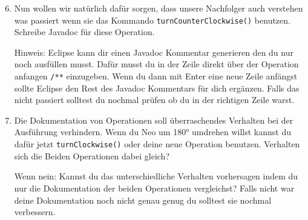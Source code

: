 \begin{enumerate}\setcounter{enumi}{5}
    \item Nun wollen wir natürlich dafür sorgen, dass unsere Nachfolger auch verstehen was passiert wenn sie das Kommando \lstinline{turnCounterClockwise()} benutzen. 
        Schreibe Javadoc für diese Operation.
        
        Hinweis: Eclipse kann dir einen Javadoc Kommentar generieren den du nur noch ausfüllen musst.
        Dafür musst du in der Zeile direkt über der Operation anfangen \lstinline{/**} einzugeben.
        Wenn du dann mit Enter eine neue Zeile anfängst sollte Eclipse den Rest des Javadoc Kommentars für dich ergänzen.
        Falls das nicht passiert solltest du nochmal prüfen ob du in der richtigen Zeile warst.
    \item Die Dokumentation von Operationen soll überraschendes Verhalten bei der Ausführung verhindern. 
        Wenn du Neo um 180° umdrehen willst kannst du dafür jetzt \lstinline{turnClockwise()} oder deine neue Operation benutzen. 
        Verhalten sich die Beiden Operationen dabei gleich?

        Wenn nein: Kannst du das unterschiedliche Verhalten vorhersagen indem du nur die Dokumentation der beiden Operationen vergleichst?
        Falls nicht war deine Dokumentation noch nicht genau genug du solltest sie nochmal verbessern.
\end{enumerate}


